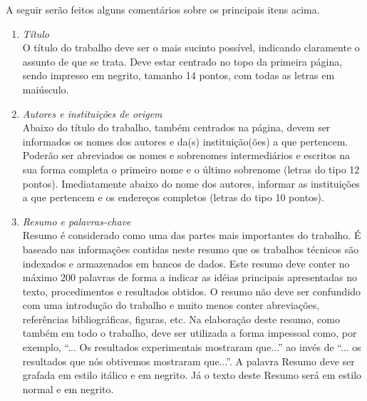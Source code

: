 \documentclass{ceel}
\begin{document}
\begin{multicols}{2}
A seguir serão feitos alguns comentários sobre os principais itens acima.
\begin{enumerate}[1)]
\item \emph{Título}\\
O título do trabalho deve ser o mais sucinto possível, indicando claramente o assunto de que se trata. Deve estar centrado no topo da primeira página, sendo impresso em negrito, tamanho 14 pontos, com todas as letras em maiúsculo.
\item \emph{Autores e instituições de origem}\\
Abaixo do título do trabalho, também centrados na página, devem ser informados os nomes dos autores e da(s) instituição(ões) a que pertencem. Poderão ser abreviados os nomes e sobrenomes intermediários e escritos na sua forma completa o primeiro nome e o último sobrenome (letras do tipo 12 pontos). Imediatamente abaixo do nome dos autores, informar as instituições a que pertencem e os endereços completos (letras do tipo 10 pontos).
\item \textit{Resumo e palavras-chave}\\
Resumo é considerado como uma das partes mais importantes do trabalho. É baseado nas informações contidas neste resumo que os trabalhos técnicos são indexados e armazenados em bancos de dados. Este resumo deve conter no máximo 200 palavras de forma a indicar as idéias principais apresentadas no texto, procedimentos e resultados obtidos. O resumo não deve ser confundido com uma introdução do trabalho e muito menos conter abreviações, referências bibliográficas, figuras, etc. Na elaboração deste resumo, como também em todo o trabalho, deve ser utilizada a forma impessoal como, por exemplo, “... Os resultados experimentais mostraram que...” ao invés de “... os resultados que nós obtivemos mostraram que...”. A palavra Resumo deve ser grafada em estilo itálico e em negrito. Já o texto deste Resumo será em estilo normal e em negrito.\\


\end{enumerate}
\end{multicols}
\end{document}
